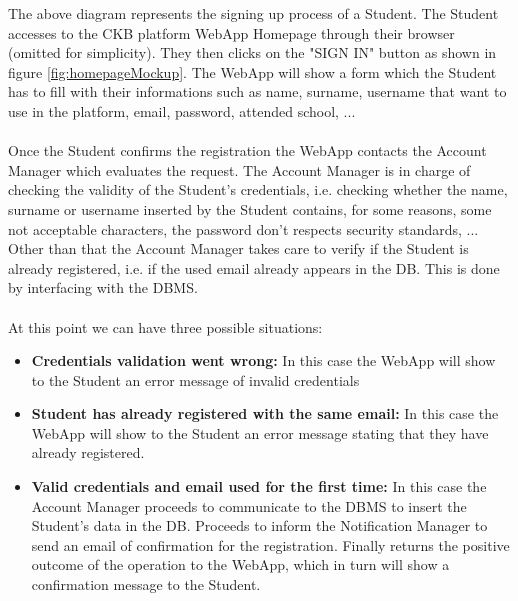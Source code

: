 \documentclass{article}
\begin{document}
{        The above diagram represents the signing up process of a Student.
        The Student accesses to the CKB platform WebApp Homepage through their browser
        (omitted for simplicity). They then clicks on the "SIGN IN" button as
        shown in figure \ref{fig:homepageMockup}. The WebApp will show a form
        which the Student has to fill with their informations such as
        name, surname, username that want to use in the platform, email,
        password, attended school, ... 
        \\ \\
        Once the Student confirms the registration the WebApp contacts the
        Account Manager which evaluates the request.
        The Account Manager is in charge of checking the validity of the Student's credentials,
        i.e. checking whether the name, surname or username inserted by the Student
        contains, for some reasons, some not acceptable characters, the password
        don't respects security standards, ... \\
        Other than that the Account Manager takes care to verify if the Student is already
        registered, i.e. if the used email already appears in the DB. This is done by interfacing
        with the DBMS.
        \\ \\
        At this point we can have three possible situations:
        \begin{itemize}
            \item \textbf{Credentials validation went wrong:} In this case the WebApp will show to the
            Student an error message of invalid credentials
            \item \textbf{Student has already registered with the same email:} In this case the WebApp will show to the
            Student an error message stating that they have already registered.
            \item \textbf{Valid credentials and email used for the first time:} In this case the Account
            Manager proceeds to communicate to the DBMS to insert the Student's data in the DB.
            Proceeds to inform the Notification Manager to send an email of confirmation for the registration.
            Finally returns the positive outcome of the operation to the WebApp, which in 
            turn will show a confirmation message to the Student.
        \end{itemize}

}
\end{document}
